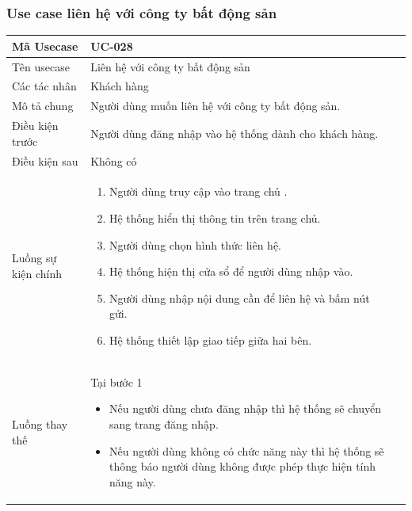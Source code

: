 \documentclass[12pt,a4paper]{article}
\begin{document}

    \subsubsection*{Use case liên hệ với công ty bất động sản}
    \begin{table}[H]
        \centering
        \begin{tabular}{|p{3.5cm}|p{11.5cm}|c|}
            \hline
            Mã Usecase      & UC-028                                                 \\
            \hline
            Tên usecase     & Liên hệ với công ty bất động sản                       \\
            \hline
            Các tác nhân    & Khách hàng                                             \\
            \hline
            Mô tả chung     & Người dùng muốn liên hệ với công ty bất động sản.      \\
            \hline

            Điều kiện trước & Người dùng đăng nhập vào hệ thống dành cho khách hàng. \\
            \hline

            Điều kiện sau   & Không có                                               \\
            \hline

            Luồng sự kiện chính & \vspace{-.8cm}\begin{enumerate}
                                                    \item Người dùng truy cập vào trang chủ .
                                                    \item Hệ thống hiển thị thông tin trên trang chủ.
                                                    \item Người dùng chọn hình thức liên hệ.
                                                    \item Hệ thống hiện thị cửa sổ để người dùng nhập vào.
                                                    \item Người dùng nhập nội dung cần để liên hệ và bấm nút gửi.
                                                    \item Hệ thống thiết lập giao tiếp giữa hai bên.
            \end{enumerate}
            \\
            \hline
            Luồng thay thế & Tại bước 1\newline
            \vspace{-.8cm}\begin{itemize}
                              \item Nếu người dùng chưa đăng nhập thì hệ thống sẽ chuyển sang trang đăng nhập.
                              \item Nếu người dùng không có chức năng này thì hệ thống sẽ thông báo người dùng không được phép thực hiện tính năng này.
            \end{itemize}


\end{tabular}
\end{table}
\end{document}

